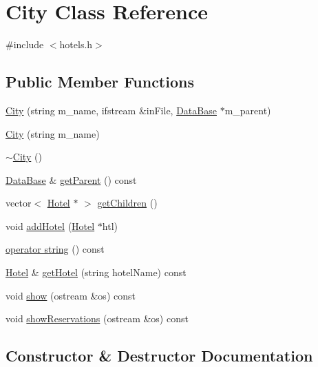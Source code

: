\hypertarget{class_city}{}\section{City Class Reference}
\label{class_city}


{\ttfamily \#include $<$hotels.\+h$>$}

\subsection*{Public Member Functions}
\begin{DoxyCompactItemize}
\item 
\hyperlink{class_city_ac0f0f98a4b34f6035ce375b249ea1f6f}{City} (string m\+\_\+name, ifstream \&in\+File, \hyperlink{class_data_base}{Data\+Base} $\ast$m\+\_\+parent)
\item 
\hyperlink{class_city_a32fffd38b77f72bf8ffdced4db06db41}{City} (string m\+\_\+name)
\item 
\hyperlink{class_city_ae95feee8a1d4e1f14ea41ec89b47304f}{$\sim$\+City} ()
\item 
\hyperlink{class_data_base}{Data\+Base} \& \hyperlink{class_city_a77c96bacad3ab36d48811749f7ae6c82}{get\+Parent} () const
\item 
vector$<$ \hyperlink{class_hotel}{Hotel} $\ast$ $>$ \hyperlink{class_city_adf8a1f3a0a67ecc07eb4eff1ee3c4e9b}{get\+Children} ()
\item 
void \hyperlink{class_city_af0fcf2e1e6da71f2b72444d9984d7163}{add\+Hotel} (\hyperlink{class_hotel}{Hotel} $\ast$htl)
\item 
\hyperlink{class_city_a41215eb7ca34723453b709bd20c0a1ae}{operator string} () const
\item 
\hyperlink{class_hotel}{Hotel} \& \hyperlink{class_city_a1215390b5e3b11dc19abeedcb096b720}{get\+Hotel} (string hotel\+Name) const
\item 
void \hyperlink{class_city_a18463913234ae61550b62693c7dd10a3}{show} (ostream \&os) const
\item 
void \hyperlink{class_city_ab8d15e9920d57b5892e073198dca0371}{show\+Reservations} (ostream \&os) const
\end{DoxyCompactItemize}


\subsection{Constructor \& Destructor Documentation}
\mbox{\label{class_city_ac0f0f98a4b34f6035ce375b249ea1f6f}} 
